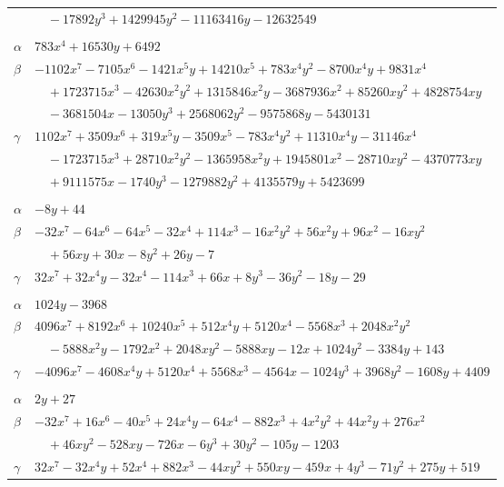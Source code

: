 \documentclass[11pt]{article}
\begin{document}
\begin{longtable}{@{}ll@{}}
 & $\quad -17892y^{3}+1429945y^{2}-11163416y-12632549$\\
\addlinespace[3pt]
\multicolumn{2}{@{}l}{$\{i,j\}=\{52,91\}$, $k_{ij}=2^{2}\cdot 3\cdot 5$}\\
$\alpha$ & $783x^{4}+16530y+6492$\\
$\beta$ & $-1102x^{7}-7105x^{6}-1421x^{5}y+14210x^{5}+783x^{4}y^{2}-8700x^{4}y+9831x^{4}$\\
 & $\quad +1723715x^{3}-42630x^{2}y^{2}+1315846x^{2}y-3687936x^{2}+85260xy^{2}+4828754xy$\\
 & $\quad -3681504x-13050y^{3}+2568062y^{2}-9575868y-5430131$\\
$\gamma$ & $1102x^{7}+3509x^{6}+319x^{5}y-3509x^{5}-783x^{4}y^{2}+11310x^{4}y-31146x^{4}$\\
 & $\quad -1723715x^{3}+28710x^{2}y^{2}-1365958x^{2}y+1945801x^{2}-28710xy^{2}-4370773xy$\\
 & $\quad +9111575x-1740y^{3}-1279882y^{2}+4135579y+5423699$\\
\addlinespace[3pt]
\multicolumn{2}{@{}l}{$\{i,j\}=\{53,58\}$, $k_{ij}=2^{2}\cdot 11$}\\
$\alpha$ & $-8y+44$\\
$\beta$ & $-32x^{7}-64x^{6}-64x^{5}-32x^{4}+114x^{3}-16x^{2}y^{2}+56x^{2}y+96x^{2}-16xy^{2}$\\
 & $\quad +56xy+30x-8y^{2}+26y-7$\\
$\gamma$ & $32x^{7}+32x^{4}y-32x^{4}-114x^{3}+66x+8y^{3}-36y^{2}-18y-29$\\
\addlinespace[3pt]
\multicolumn{2}{@{}l}{$\{i,j\}=\{53,75\}$, $k_{ij}=3^{2}\cdot 7^{2}$}\\
$\alpha$ & $1024y-3968$\\
$\beta$ & $4096x^{7}+8192x^{6}+10240x^{5}+512x^{4}y+5120x^{4}-5568x^{3}+2048x^{2}y^{2}$\\
 & $\quad -5888x^{2}y-1792x^{2}+2048xy^{2}-5888xy-12x+1024y^{2}-3384y+143$\\
$\gamma$ & $-4096x^{7}-4608x^{4}y+5120x^{4}+5568x^{3}-4564x-1024y^{3}+3968y^{2}-1608y+4409$\\
\addlinespace[3pt]
\multicolumn{2}{@{}l}{$\{i,j\}=\{54,80\}$, $k_{ij}=2^{2}\cdot 3^{4}\cdot 7$}\\
$\alpha$ & $2y+27$\\
$\beta$ & $-32x^{7}+16x^{6}-40x^{5}+24x^{4}y-64x^{4}-882x^{3}+4x^{2}y^{2}+44x^{2}y+276x^{2}$\\
 & $\quad +46xy^{2}-528xy-726x-6y^{3}+30y^{2}-105y-1203$\\
$\gamma$ & $32x^{7}-32x^{4}y+52x^{4}+882x^{3}-44xy^{2}+550xy-459x+4y^{3}-71y^{2}+275y+519$\\

\end{longtable}
\end{document}
